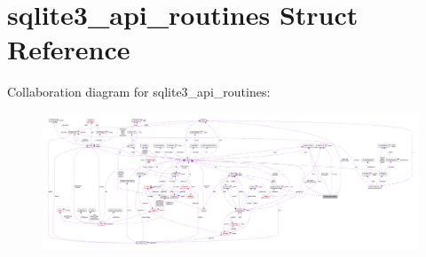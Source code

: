 \hypertarget{structsqlite3__api__routines}{}\section{sqlite3\+\_\+api\+\_\+routines Struct Reference}
\label{structsqlite3__api__routines}


Collaboration diagram for sqlite3\+\_\+api\+\_\+routines\+:\nopagebreak
\begin{figure}[H]
\begin{center}
\leavevmode
\includegraphics[width=350pt]{structsqlite3__api__routines__coll__graph}
\end{center}
\end{figure}
